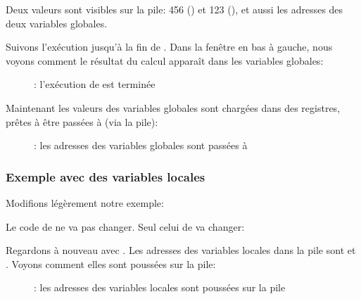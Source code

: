Deux valeurs sont visibles sur la pile: 456 () et 123 (), et aussi
les adresses des deux variables globales.

\clearpage
Suivons l'exécution jusqu'à la fin de \ttfone.
Dans la fenêtre en bas à gauche, nous voyons comment le résultat du calcul apparaît
dans les variables globales:

\begin{figure}[H]
\centering
{}
\caption{\olly: l'exécution de \ttfone est terminée}
\label{fig:pointers_olly_global_3}
\end{figure}

\clearpage

Maintenant les valeurs des variables globales sont chargées dans des registres, prêtes
à être passées à \printf (via la pile):

\begin{figure}[H]
\centering
{}
\caption{\olly: 
les adresses des variables globales sont passées à \printf}
\label{fig:pointers_olly_global_4}
\end{figure}

\subsubsection{Exemple avec des variables locales}

Modifions légèrement notre exemple:



Le code de \ttfone ne va pas changer.
Seul celui de \main va changer:



\newcommand{\PtrsAddresses}{\TT{0x2EF854} et \TT{0x2EF858}\xspace}

\clearpage
Regardons à nouveau avec \olly.
Les adresses des variables locales dans la pile sont \PtrsAddresses.
Voyons comment elles sont poussées sur la pile:

\begin{figure}[H]
\centering
{}
\caption{\olly: les adresses des variables locales sont poussées sur la pile}
\label{fig:pointers_olly_stk_1}
\end{figure}

